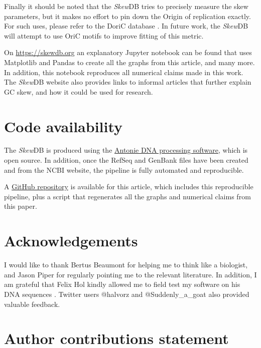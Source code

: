 \documentclass[fleqn,10pt]{wlscirep}
\begin{document}
Finally it should be noted that the \emph{Skew}DB tries to precisely measure the skew parameters, but it makes no effort to pin down the Origin of replication exactly. For such uses, please refer to the DoriC database \cite{luo_doric_2019}. In future work, the \emph{Skew}DB will attempt to use OriC motifs to improve fitting of this metric.

On \url{https://skewdb.org} an explanatory Jupyter \cite{Kluyver:2016aa} notebook can be found that uses Matplotlib \cite{Hunter:2007} and Pandas \cite{jeff_reback_2021_5203279} to create all the graphs from this article, and many more. In addition, this notebook reproduces all numerical claims made in this work. The \emph{Skew}DB website also provides links to informal articles that further explain GC skew, and how it could be used for research.

\section*{Code availability}
The \emph{Skew}DB is produced using the \href{https://github.eu/berthubert/antonie2}{Antonie DNA processing software}, which is open source. In addition, once the RefSeq and GenBank files have been created and from the NCBI website, the pipeline is fully automated and reproducible. 

A \href{https://github.com/berthubert/skewdb-articles}{GitHub repository} is available for this article, which includes this reproducible pipeline, plus a script that regenerates all the graphs and numerical claims from this paper. 




\section*{Acknowledgements} 

I would like to thank Bertus Beaumont for helping me to think like a biologist, and Jason Piper for regularly pointing me to the relevant literature. In addition, I am grateful that Felix Hol kindly allowed me to field test my software on his DNA sequences \cite{hol_density-dependent_2016}. Twitter users @halvorz and @Suddenly\_a\_goat also provided valuable feedback.

\section*{Author contributions statement}
\end{document}
